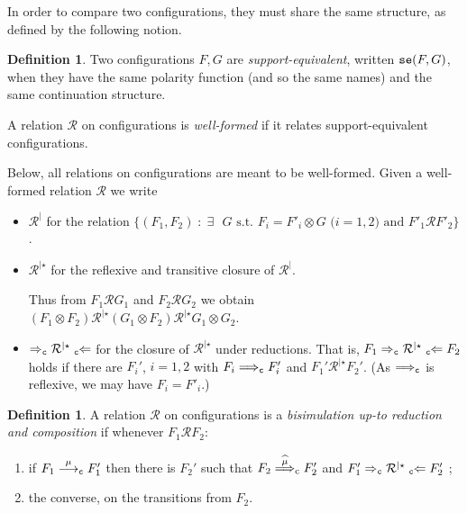 \documentclass[11pt,a4paper]{amsart}
\theoremstyle{plain}
\theoremstyle{definition}
\theoremstyle{defC}
\theoremstyle{thmC}
\theoremstyle{plain}
\numberwithin{equation}{section}
\newcommand{\appendCon}[2]{#1 \otimes #2}
\newcommand{\appendRel}[1]{#1^{|}}
\newcommand{\uptoComp}[1]{\mathrel{#1^{|\star}}}
\newcommand{\uptoCompRed}[1]{\mathrel{\Rightarrowp #1^{|\star} 
                                   \Leftarrowp}}
\newcommand{\okC}[2]{{\tt se}(#1,#2)}  %
\newcommand{\rmm}[1]{{\tt{\lowercase{#1}}}}
\newcommand{\genarr}[2]{\mathrel{\stackrel{{#1}}{\longrightarrow}_{\rmm{\lowercase{#2}}}}}
\newcommand{\genArcap}[2]{\mathrel{\stackrel{{\widehat{#1}}}{\Longrightarrow}_{\rm{\lowercase{#2}}}}}
\newcommand{\genLongrightarrow}[1]{\mathrel{\Longrightarrow_{\rmm{\lowercase{#1}}}}}
\newcommand{\genLeftarrow}[1]{\mathrel{\mbox{}_{\rmm{\lowercase{#1}}}\!\!\Leftarrow}}
\newcommand{\genRightarrow}[1]{\mathrel{\Rightarrow_{\rmm{\lowercase{#1}}}}}
\newcommand{\arrC}[1]{\genarr{#1}{C}}   %
\newcommand{\Arcapp}[1]{\genArcap{#1}{C}}   %
\newcommand{\Longrightarrowp}{\genLongrightarrow{C}}
\newcommand{\Leftarrowp}{\genLeftarrow{C}}
\newcommand{\Rightarrowp}{\genRightarrow{C}}
\def\R{{\mathcal R}}
\def\RR{\mathrel{\mathcal R}}
\def\st{\; : \;}
\newcommand{\FF}{F}
\newcommand{\GG}{G}
\newcommand{\act}{\mu}
\theoremstyle{plain}
\theoremstyle{definition}
\newtheorem{definition}[thm]{Definition}
\begin{document}
In order to compare two configurations,
they must share the same structure, as defined by the following notion.
\begin{definition}
\label{d:compa}
Two configurations $\FF,\GG$ are \emph{support-equivalent}, written 
$\okC \FF\GG$, when they have the same polarity function (and so the same names) and the
same continuation structure.

\noindent
A relation $\R$ on configurations is \emph{well-formed} if it relates
support-equivalent configurations. 
\end{definition} 

\noindent
Below, all relations on configurations are meant to be well-formed. 
Given a well-formed relation $\R$ we write
\begin{itemize}
\item $\appendRel \R $ for the relation
$
\{ (\FF_1,\FF_2) \st
\mbox{$\exists$ $\GG$ s.t.\ }
 \FF_i = \appendCon{\FF'_i}\GG \mbox{ ($i=1,2$)}  \mbox{ and } 
 \FF'_1\RR \FF'_2\}
$.
\item
$\uptoComp \R $ for the reflexive and transitive closure of 
$\appendRel \R $.

Thus from $\FF_1 \RR  
\GG_1$ and  $\FF_2 \RR
\GG_2$ we obtain 
$(\appendCon{\FF_1}{\FF_2})  \uptoComp{\R}   
(\appendCon{\GG_1}{\FF_2}) \uptoComp{\R}  \appendCon{\GG_1}{\GG_2}.$



\item 
$\uptoCompRed \R $ for the closure of $\uptoComp \R $ under
reductions. That is, $\FF_1 \uptoCompRed \R \FF_2$ holds if there are 
$\FF_i'$, $i=1,2$ with $\FF_i \Longrightarrowp \FF'_i$ and 
$\FF_1' \uptoComp \R \FF_2'$.
(As $\Longrightarrowp$ is reflexive, we may have $\FF_i =
\FF'_i$.) 
\end{itemize}
 
\begin{definition}
\label{d:uptoComp}
A relation $\R$ on configurations is a \emph{bisimulation up-to
 reduction and   composition } if whenever $\FF_1 \RR \FF_2$: 
\begin{enumerate}
\item
 if $\FF_1 \arrC\act \FF_1'  $ then there is $\FF_2' $ such that 
$\FF_2 \Arcapp\act \FF_2'  $ and 
$\FF'_1 \uptoCompRed \R \FF'_2$ ;

\item the converse, on the transitions from  $\FF_2$.
\end{enumerate}
\end{definition}
\end{document}
